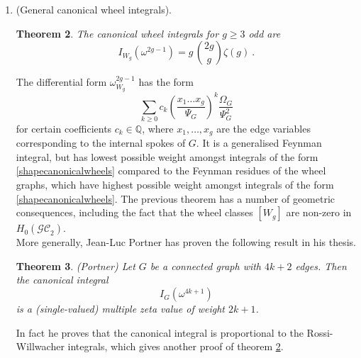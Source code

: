 \documentclass[12pt]{amsart}
\newcommand{\QQ}{{\mathbb Q}}
\theoremstyle{plain}
\newtheorem{thm}{Theorem}
\newcommand{\GC}{\mathcal{GC}}
\newcommand{\0}{\color{blue}{\mathsf{0}}}
\begin{document}
\begin{enumerate}
\begin{thm} Let $\Xi \in \GC_2$ be a linear combination of oriented graphs with $g$ loops and  $4k+2$ edges whose differential vanishes: $d \,\Xi=0.$ Then if the canonical integral $I_{\Xi}(\omega^{4k+1})$ is non-zero,  $[\Xi] \in H_0(\GC_2)$ is non-zero in homology.
\end{thm} 
It follows that the canonical integrals can detect graph homology cycles. \\




 \item (General canonical wheel integrals).
 
 \begin{thm} \label{thm43}  \cite{BrownSchnetzoneformmatrices}  The canonical wheel integrals for $g\geq 3$ odd are
 \[ I_{W_g}(\omega^{2g-1}) =  g \, \binom{2g}{g} \zeta(g)\ .\]
   \end{thm} 

   The differential form $\omega_{W_g}^{2g-1}$ has the form 
   \begin{equation} \label{shapecanonicalwheels} \sum_{k\geq 0}   c_k \left(\frac{x_1\ldots x_g}{\Psi_G}\right)^k  \frac{\Omega_G}{\Psi_G^2} \end{equation}
   for certain coefficients $c_k \in \QQ$, where $x_1,\ldots, x_g$ are the edge variables corresponding to the internal spokes of $G$. It is a generalised Feynman integral, but has lowest possible weight amongst integrals of the form \eqref{shapecanonicalwheels} compared to the Feynman residues of the wheel graphs, which have highest possible weight amongst integrals of the form \eqref{shapecanonicalwheels}. 
The previous theorem  has a number of geometric consequences, including the fact that the wheel classes $[W_g]$ are non-zero in $H_0(\GC_2)$.  
\\

More generally, Jean-Luc Portner  has proven the following result in his thesis. 


\begin{thm} (Portner) Let $G$ be a connected graph with  $4k+2$ edges. Then the  canonical integral 
\[  I_G(\omega^{4k+1}) \]
is a (single-valued) multiple zeta value of weight $2k+1$.
\end{thm} 
In fact he proves that the canonical integral is proportional to the Rossi-Willwacher integrals, which gives another proof of  theorem \ref{thm43}. 

 \end{enumerate}
 
\end{document}
